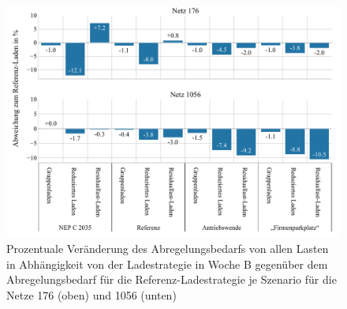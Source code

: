 \begin{figure}[H]
    \centering
    \includegraphics[width=\textwidth]{Bilder/176_1056_cur_load_grid_week_B}
    \caption{Prozentuale Veränderung des Abregelungsbedarfs von allen Lasten in Abhängigkeit von der Ladestrategie in Woche B gegenüber dem Abregelungsbedarf für die Referenz-Ladestrategie je Szenario für die Netze \num{176} (oben) und \num{1056} (unten)}\label{fig:176_1056_cur_load_grid_week_B}
\end{figure}